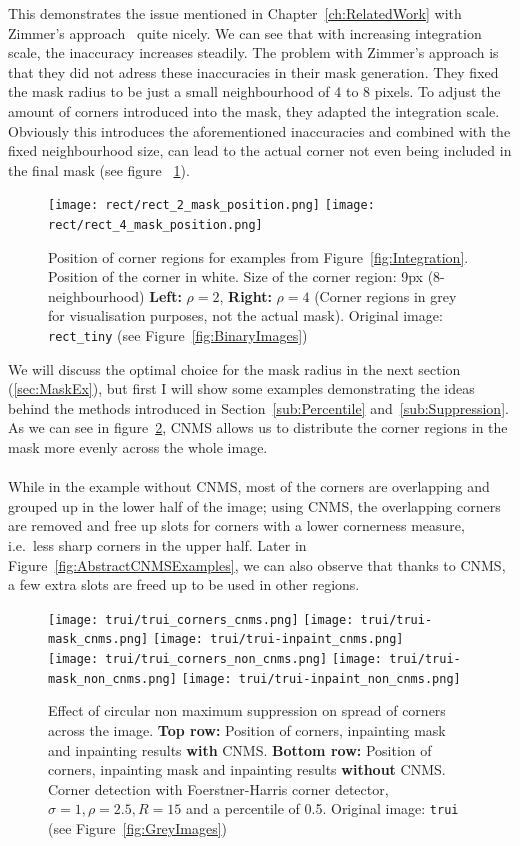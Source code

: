 This demonstrates the issue mentioned in Chapter~\ref{ch:RelatedWork} with Zimmer's approach~\cite{zimmer07} quite nicely. 
We can see that with increasing integration scale, the inaccuracy increases
steadily. The problem with Zimmer's approach is that they did not adress these inaccuracies in
their mask generation. They fixed the mask radius to be just a small neighbourhood of 4 to 8 pixels.
To adjust the amount of corners introduced into the mask, they adapted the integration scale.
Obviously this introduces the aforementioned inaccuracies and combined with the fixed neighbourhood
size, can lead to the actual corner not even being included in the final mask (see figure
~\ref{fig:Inacc}).
\begin{figure}[h]
    \centering
    \texttt{[image: rect/rect\_2\_mask\_position.png]}
    \texttt{[image: rect/rect\_4\_mask\_position.png]}
    \caption{Position of corner regions for examples from Figure~\ref{fig:Integration}.
        Position of the corner in white. Size of the corner region: 9px (8-neighbourhood)
    \textbf{Left:} $\rho=2$, \textbf{Right:} $\rho=4$ (Corner regions in grey for visualisation
purposes, not the actual mask). Original image: \texttt{rect\_tiny} (see Figure~\ref{fig:BinaryImages})}\label{fig:Inacc}
\end{figure}
We will discuss the optimal choice for the mask radius in the next section (\ref{sec:MaskEx}), but
first I will show some examples demonstrating the ideas behind the methods introduced in
Section~\ref{sub:Percentile} and~\ref{sub:Suppression}. As we can see in
figure~\ref{fig:CNMSExample}, CNMS allows us to distribute the corner regions in the mask more
evenly across the whole image. \\\ \\
While in the example without CNMS, most of the corners are
overlapping and grouped up in the lower half of the image; using CNMS, the overlapping corners are
removed and free up slots for corners with a lower cornerness measure, i.e.\ less sharp corners in
the upper half. Later in Figure~\ref{fig:AbstractCNMSExamples}, we can also observe that thanks to
CNMS, a few extra slots are freed up to be used in other regions.
\begin{figure}
    \centering
    \texttt{[image: trui/trui\_corners\_cnms.png]}
    \texttt{[image: trui/trui-mask\_cnms.png]}
    \texttt{[image: trui/trui-inpaint\_cnms.png]}\\
    \vspace{0.2cm}
    \texttt{[image: trui/trui\_corners\_non\_cnms.png]}
    \texttt{[image: trui/trui-mask\_non\_cnms.png]}
    \texttt{[image: trui/trui-inpaint\_non\_cnms.png]}
    \caption{Effect of circular non maximum suppression on spread of corners across the image.
        \textbf{Top row:} Position of corners, inpainting mask and inpainting results
        \textbf{with} CNMS\@.
\textbf{Bottom row:} Position of corners, inpainting mask and inpainting results \textbf{without}
CNMS\@.
    Corner detection with Foerstner-Harris corner detector, $\sigma=1,\rho=2.5,R=15$ and a
percentile of 0.5. Original image: \texttt{trui} (see Figure~\ref{fig:GreyImages})}\label{fig:CNMSExample}
\end{figure}
